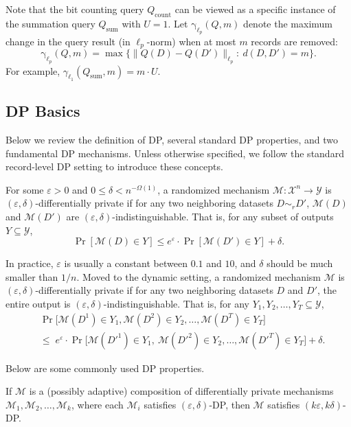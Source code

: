 Note that the bit counting query $Q_\text{count}$ can be viewed as a specific instance of the summation query $Q_\text{sum}$ with $U=1$. 
Let $\mathrm{\gamma}_{\ell_p}(Q,m)$ denote the maximum change in the query result (in $\ell_p$-norm) when at most $m$ records are removed:
\[\mathrm{\gamma}_{\ell_p}(Q,m) =\max \big\{\|Q(D)-Q(D')\|_{\ell_p}:\ d(D,D')=m\big\}.\]
For example, $\gamma_{\ell_1}(Q_\text{sum},m)=m\cdot U.$


\subsection{DP Basics}
\label{sec:DP Basics}
Below we review the definition of DP, several standard DP properties, and two fundamental DP mechanisms.
Unless otherwise specified, we follow the standard record-level DP setting to introduce these concepts.


\begin{definition}
\label{def: DP}
    For some $\varepsilon > 0$ and $0 \leq \delta < n^{-\Omega(1)}$, a randomized mechanism $\mathcal{M}:\mathcal{X}^{n} \to \mathcal{Y}$ is $(\varepsilon, \delta)$-differentially private if for any two neighboring datasets $D \sim_r D'$, $\mathcal{M}(D)$ and $\mathcal{M}(D')$ are $(\varepsilon, \delta)$-indistinguishable. That is, for any subset of outputs $Y\subseteq \mathcal{Y}$,
    \[
    \Pr[\mathcal{M}(D) \in Y ] \leq e^\varepsilon \cdot \Pr[\mathcal{M}(D') \in Y ] + \delta.
    \]
\end{definition}



In practice, $\varepsilon$ is usually a constant between $0.1$ and $10$, and $\delta$ should be much smaller than $1/n$.
Moved to the dynamic setting, a randomized mechanism $\mathcal{M}$ is $(\varepsilon, \delta)$-differentially private if for any two neighboring datasets $D$ and $D'$, the entire output is $(\varepsilon, \delta)$-indistinguishable. That is, for any $Y_1, Y_2, \dots, Y_T \subseteq \mathcal{Y}$,
\[
\begin{aligned}
&\Pr\!\big[ \mathcal{M}(D^1)\in Y_1, \mathcal{M}(D^2)\in Y_2, \dots, \mathcal{M}(D^T)\in Y_T \big] \\
&\le\;
e^{\varepsilon}\cdot
\Pr\!\big[ \mathcal{M}(D'^1)\in Y_1,\ \mathcal{M}(D'^2)\in Y_2, \dots, \mathcal{M}(D'^T)\in Y_T \big]
+\delta .
\end{aligned}
\]


Below are some commonly used DP properties.

\begin{lemma} 
\label{lem:Sequential Composition}
If $ \mathcal{M} $ is a (possibly adaptive) composition of differentially private mechanisms $ \mathcal{M}_1,\mathcal{M}_2,\dots, \mathcal{M}_k$, where each $ \mathcal{M}_i$ satisfies $(\varepsilon, \delta)$-DP, then $ \mathcal{M} $ satisfies $(k\varepsilon, k\delta)$-DP.
\end{lemma} 

